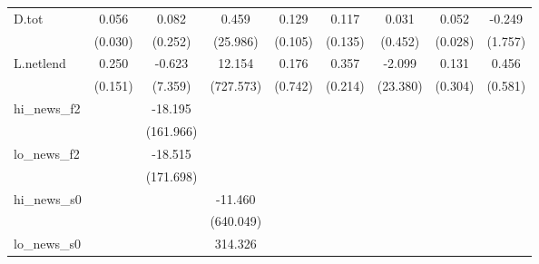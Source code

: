 {\begin{tabular}{l*{8}{c}}
\addlinespace
D.tot       &       0.056\sym{*}  &       0.082         &       0.459         &       0.129         &       0.117         &       0.031         &       0.052\sym{*}  &      -0.249         \\
            &     (0.030)         &     (0.252)         &    (25.986)         &     (0.105)         &     (0.135)         &     (0.452)         &     (0.028)         &     (1.757)         \\
\addlinespace
L.netlend   &       0.250\sym{*}  &      -0.623         &      12.154         &       0.176         &       0.357\sym{*}  &      -2.099         &       0.131         &       0.456         \\
            &     (0.151)         &     (7.359)         &   (727.573)         &     (0.742)         &     (0.214)         &    (23.380)         &     (0.304)         &     (0.581)         \\
\addlinespace
hi\_news\_f2  &                     &     -18.195         &                     &                     &                     &                     &                     &                     \\
            &                     &   (161.966)         &                     &                     &                     &                     &                     &                     \\
\addlinespace
lo\_news\_f2  &                     &     -18.515         &                     &                     &                     &                     &                     &                     \\
            &                     &   (171.698)         &                     &                     &                     &                     &                     &                     \\
\addlinespace
hi\_news\_s0  &                     &                     &     -11.460         &                     &                     &                     &                     &                     \\
            &                     &                     &   (640.049)         &                     &                     &                     &                     &                     \\
\addlinespace
lo\_news\_s0  &                     &                     &     314.326         &                     &                     &                     &                     &                     \\

\end{tabular}}
